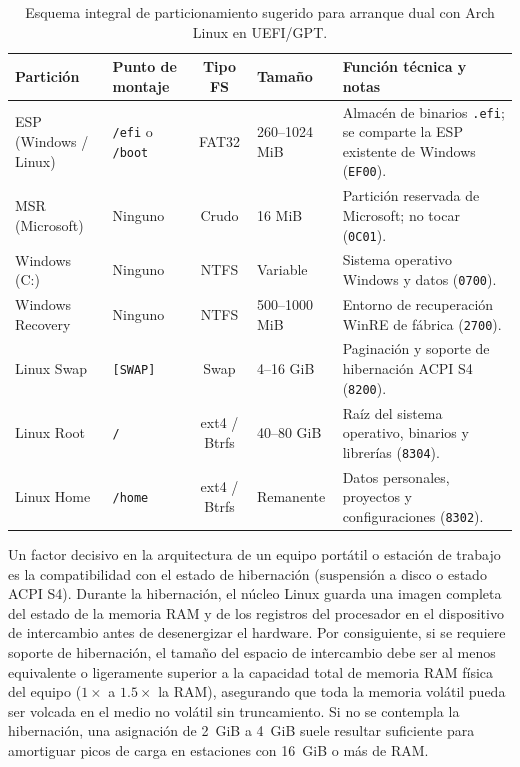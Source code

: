 \documentclass[12pt]{article}
\begin{document}
\begin{table}[H]
\centering
\small
\caption{Esquema integral de particionamiento sugerido para arranque dual con Arch Linux en UEFI/GPT.}
\label{tab:esquemaParticionamientoDualBoot}
\begin{tabularx}{\textwidth}{p{3.2cm} p{2.2cm} c p{2.0cm} X}
\toprule
\textbf{Partición} & \textbf{Punto de montaje} & \textbf{Tipo FS} & \textbf{Tamaño} & \textbf{Función técnica y notas} \\
\midrule
ESP (Windows / Linux) & \texttt{/efi} o \texttt{/boot} & FAT32 & 260--1024 MiB & Almacén de binarios \texttt{.efi}; se comparte la ESP existente de Windows (\texttt{EF00}). \\
MSR (Microsoft) & Ninguno & Crudo & 16 MiB & Partición reservada de Microsoft; no tocar (\texttt{0C01}). \\
Windows (C:) & Ninguno & NTFS & Variable & Sistema operativo Windows y datos (\texttt{0700}). \\
Windows Recovery & Ninguno & NTFS & 500--1000 MiB & Entorno de recuperación WinRE de fábrica (\texttt{2700}). \\
\midrule
Linux Swap & \texttt{[SWAP]} & Swap & 4--16 GiB & Paginación y soporte de hibernación ACPI S4 (\texttt{8200}). \\
Linux Root & \texttt{/} & ext4 / Btrfs & 40--80 GiB & Raíz del sistema operativo, binarios y librerías (\texttt{8304}). \\
Linux Home & \texttt{/home} & ext4 / Btrfs & Remanente & Datos personales, proyectos y configuraciones (\texttt{8302}). \\
\bottomrule
\end{tabularx}
\end{table}

Un factor decisivo en la arquitectura de un equipo portátil o estación de trabajo es la compatibilidad con el estado de hibernación (suspensión a disco o estado ACPI S4). Durante la hibernación, el núcleo Linux guarda una imagen completa del estado de la memoria RAM y de los registros del procesador en el dispositivo de intercambio antes de desenergizar el hardware. Por consiguiente, si se requiere soporte de hibernación, el tamaño del espacio de intercambio debe ser al menos equivalente o ligeramente superior a la capacidad total de memoria RAM física del equipo ($1\times$ a $1.5\times$ la RAM), asegurando que toda la memoria volátil pueda ser volcada en el medio no volátil sin truncamiento. Si no se contempla la hibernación, una asignación de 2~GiB a 4~GiB suele resultar suficiente para amortiguar picos de carga en estaciones con 16~GiB o más de RAM.
\end{document}
